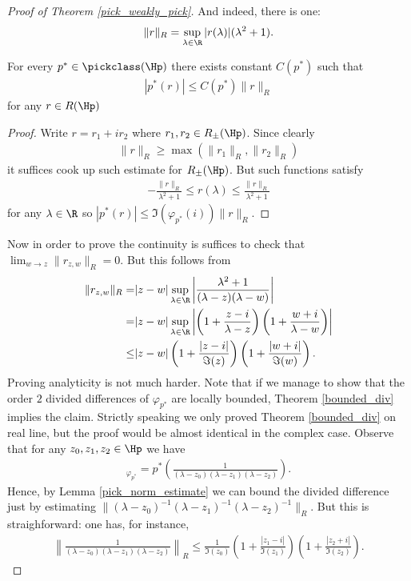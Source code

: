\begin{proof}[Proof of Theorem \ref{pick_weakly_pick}]
	And indeed, there is one:
	\begin{align*}
		\|r\|_{R} = \sup_{\lambda \in \R} |r(\lambda)| (\lambda^2 + 1).
	\end{align*}
	\begin{lem}\label{pick_norm_estimate}
		For every $p^{*} \in \pickclass(\Hp)$ there exists constant $C(p^{*})$ such that
		\begin{align*}
			\left|p^{*} (r)\right| \leq C(p^{*}) \|r\|_{R}
		\end{align*}
		for any $r \in R(\Hp)$
	\end{lem}
	\begin{proof}
		Write $r = r_{1} + i r_{2}$ where $r_{1}, r_{2} \in R_{\pm}(\Hp)$. Since clearly
		\begin{align*}
			\|r\|_{R} \geq \max(\|r_{1}\|_{R}, \|r_{2}\|_{R})
		\end{align*} it suffices cook up such estimate for $R_{\pm}(\Hp)$. But such functions satisfy
		\begin{align*}
			-\frac{\|r\|_{R}}{\lambda^2 + 1} \leq r(\lambda) \leq \frac{\|r\|_{R}}{\lambda^2 + 1} 
		\end{align*}
		for any $\lambda \in \R$ so $|p^{*}(r)| \leq \Im(\varphi_{p^{*}}(i)) \|r\|_{R}$.
	\end{proof}
	Now in order to prove the continuity is suffices to check that $\lim_{w \to z} \|r_{z, w}\|_{R} = 0$. But this follows from
	\begin{align*}
		\|r_{z, w}\|_{R} = & |z - w| \sup_{\lambda \in \R}\left|\frac{\lambda^2 + 1}{(\lambda - z) (\lambda - w)}\right| \\
		= & |z - w| \sup_{\lambda \in \R}\left|\left(1 + \frac{z - i}{\lambda - z}\right) \left(1 + \frac{w + i}{\lambda - w}\right)\right| \\
		\leq & |z - w| \left(1 + \frac{|z - i|}{\Im(z)}\right) \left(1 + \frac{|w + i|}{\Im(w)}\right).
	\end{align*}
	Proving analyticity is not much harder. Note that if we manage to show that the order $2$ divided differences of $\varphi_{p^{*}}$ are locally bounded, Theorem \ref{bounded_div} implies the claim. Strictly speaking we only proved Theorem \ref{bounded_div} on real line, but the proof would be almost identical in the complex case. Observe that for any $z_{0}, z_{1}, z_{2} \in \Hp$ we have
	\begin{align*}
		[z_{0}, z_{1}, z_{2}]_{\varphi_{p^{*}}} = p^{*}\left(\frac{1}{(\lambda - z_{0}) (\lambda - z_{1}) (\lambda - z_{2})} \right).
	\end{align*}
	Hence, by Lemma \ref{pick_norm_estimate} we can bound the divided difference just by estimating $\|(\lambda - z_{0})^{-1} (\lambda - z_{1})^{-1} (\lambda - z_{2})^{-1}\|_{R}$. But this is straighforward: one has, for instance,
	\begin{align*}
		\left\|\frac{1}{(\lambda - z_{0}) (\lambda - z_{1}) (\lambda - z_{2})}\right\|_{R} \leq \frac{1}{\Im(z_{0})} \left(1 + \frac{|z_{1} - i|}{\Im(z_{1})}\right) \left(1 + \frac{|z_{2} + i|}{\Im(z_{2})}\right).
	\end{align*}
\end{proof}

